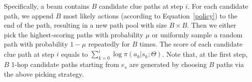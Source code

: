 \documentclass[11pt,a4paper]{article}
\begin{document}
Specifically, a beam contains $B$ candidate clue paths at step $i$. For each
candidate path, we append $B$ most likely actions (according to
Equation~\ref{policy}) to the end of the path, resulting in a new path pool with size
$B \times B$. Then we either pick the highest-scoring paths with probability
$\mu$ or uniformly sample a random path with probability $1-\mu$ repeatedly for
$B$ times. The score of each candidate clue path at step $i$ equals
to $\sum_{k=0}^{i}\log\pi(a_{k}|s_{k};\Theta)$. Note that, at the first step, $B$ 1-hop
candidate paths starting from $e_s$ are generated by choosing $B$ paths via
the above picking strategy.





  


\end{document}
